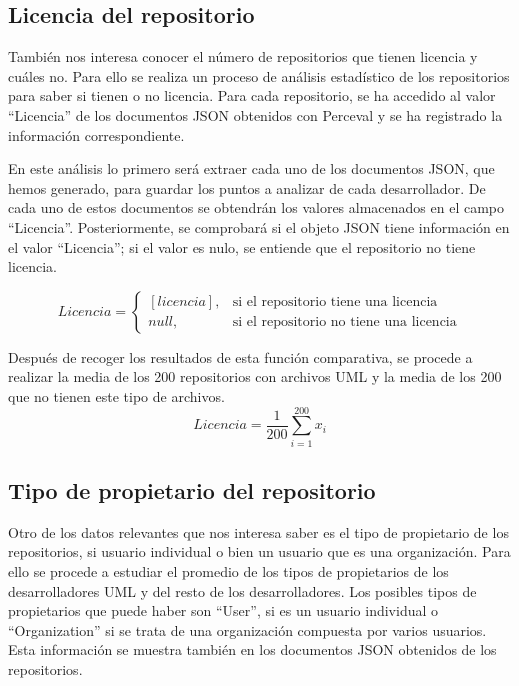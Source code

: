 \documentclass[a4paper, 12pt]{book}
\begin{document}
\subsection{Licencia del repositorio} %
\label{sec:licencia del repositorio}
También nos interesa conocer el número de repositorios que tienen licencia y cuáles no.
Para ello se realiza un proceso de análisis estadístico de los repositorios para saber si tienen o no licencia.
Para cada repositorio, se ha accedido al valor ``Licencia'' de los documentos JSON obtenidos con Perceval y se ha registrado la información correspondiente.

En este análisis lo primero será extraer cada uno de los documentos JSON, que hemos generado, para guardar los puntos a analizar de cada desarrollador.
De cada uno de estos documentos se obtendrán los valores almacenados en el campo ``Licencia''.
Posteriormente, se comprobará si el objeto JSON tiene información en el valor ``Licencia''; si el valor es nulo, se entiende que el repositorio no tiene licencia.


\begin{equation}
  Licencia =
  \begin{cases}
  [licencia], & \text{si el repositorio tiene una licencia} \\
  null, & \text{si el repositorio no tiene una licencia}
  \end{cases}
\end{equation}

Después de recoger los resultados de esta función comparativa, se procede a realizar la media de los 200 repositorios con archivos UML y la media de los 200 que no tienen este tipo de archivos.
\[{Licencia} = \frac{1}{200} \sum_{i=1}^{200} x_i\]


\subsection{Tipo de propietario del repositorio} %
\label{sec:tipo de propietario del repositorio}

Otro de los datos relevantes que nos interesa saber es el tipo de propietario de los repositorios, si usuario individual o bien un usuario que es una organización. 
Para ello se procede a estudiar el promedio de los tipos de propietarios de los desarrolladores UML y del resto de los desarrolladores.
Los posibles tipos de propietarios que puede haber son ``User'', si es un usuario individual o ``Organization'' si se trata de una organización compuesta por varios usuarios.
Esta información se muestra también en los documentos JSON obtenidos de los repositorios.
\end{document}
